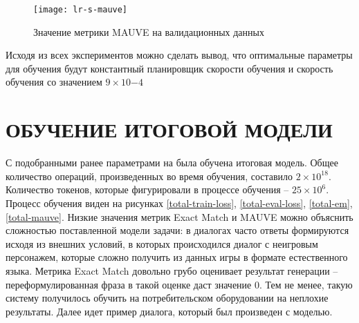 \begin{figure}[!ht]
  \centering
  \texttt{[image: lr-s-mauve]}
  \caption{Значение метрики MAUVE на валидационных данных}
  \label{lr-mauve}
\end{figure}

Исходя из всех экспериментов можно сделать вывод, что оптимальные параметры для обучения будут константный планировщик скорости обучения и скорость обучения со значением $9 \times 10{-4}$

\section{ОБУЧЕНИЕ ИТОГОВОЙ МОДЕЛИ}

С подобранными ранее параметрами на была обучена итоговая модель. Общее количество операций, произведенных во время обучения, составило $2 \times 10^{18}$. Количество токенов, которые фигурировали в процессе обучения -- $25 \times 10^{6}$. Процесс обучения виден на рисунках \ref{total-train-loss}, \ref{total-eval-loss}, \ref{total-em}, \ref{total-mauve}. Низкие значения метрик Exact Match и MAUVE можно объяснить сложностью поставленной модели задачи: в диалогах часто ответы формируются исходя из внешних условий, в которых происходился диалог с неигровым персонажем, которые сложно получить из данных игры в формате естественного языка. Метрика Exact Match довольно грубо оценивает результат генерации -- переформулированная фраза в такой оценке даст значение 0. Тем не менее, такую систему получилось обучить на потребительском оборудовании на неплохие результаты. Далее идет пример диалога, который был произведен с моделью.


